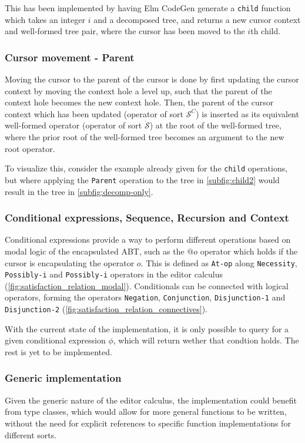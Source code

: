 \documentclass[sigplan,review]{acmart}
\begin{document}
This has been implemented by having Elm CodeGen generate a \texttt{child} function which
takes an integer $i$ and a decomposed tree, and returns a new cursor context
and well-formed tree pair, where the cursor has been moved to the $i$th child.

\subsubsection{Cursor movement - Parent}

Moving the cursor to the parent of the cursor is done by first updating the cursor context
by moving the context hole a level up, such that the parent of the context hole
becomes the new context hole. Then, the parent of the cursor context which has
been updated (operator of sort $\mathcal{S}^C$) is inserted as its equivalent
well-formed operator (operator of sort $\dot{\mathcal{S}}$) at the root of the
well-formed tree, where the prior root of the well-formed tree becomes an argument to the new root operator.

To visualize this, consider the example already given for the \texttt{child} operations, but where applying the \texttt{Parent} operation to the tree in \cref{subfig:child2} would result in the tree in \cref{subfig:decomp-only}.

\subsubsection{Conditional expressions, Sequence, Recursion and Context}

Conditional expressions provide a way to perform different operations based on
modal logic of the encapsulated ABT, such as the $@o$ operator which holds
if the cursor is encapsulating the operator $o$. This is defined as \texttt{At-op}
along \texttt{Necessity}, \texttt{Possibly-i} and \texttt{Possibly-i} operators
in the editor calculus (\cref{fig:satisfaction_relation_modal}). Conditionals
can be connected with logical operators, forming the operators \texttt{Negation},
\texttt{Conjunction}, \texttt{Disjunction-1} and \texttt{Disjunction-2}
(\cref{fig:satisfaction_relation_connectives}).

With the current state of the implementation, it is only possible to query for a given conditional expression $\phi$, which will return wether that condtion holds. The rest is yet to be implemented.

\subsubsection{Generic implementation}
Given the generic nature of the editor calculus, the implementation could
benefit from type classes, which would allow for more general functions
to be written, without the need for explicit references to specific
function implementations for different sorts.
\end{document}
